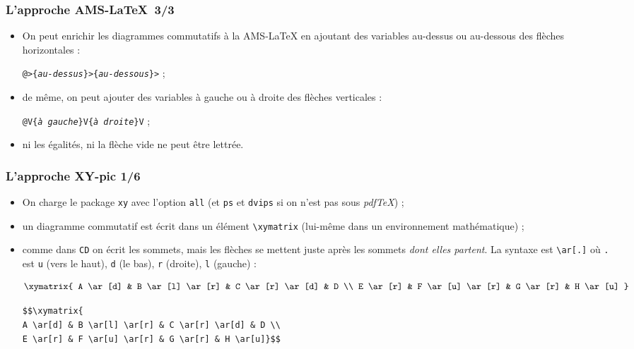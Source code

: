 \begin{frame}[fragile]
\frametitle{L'approche AMS-\LaTeX\ 3/3}

\begin{itemize}

\item On peut enrichir les diagrammes commutatifs \og à la AMS-\LaTeX\fg{} en ajoutant des variables au-dessus ou au-dessous des flèches horizontales : 

\texttt{@>\{\textit{au-dessus}\}>\{\textit{au-dessous}\}>} ;

\item de même, on peut ajouter des variables à gauche ou à droite des flèches verticales :

\texttt{@V\{\textit{à gauche}\}V\{\textit{à droite}\}V} ;

\item ni les égalités, ni la flèche vide ne peut être lettrée.

\end{itemize}

\end{frame}

\begin{frame}[fragile]
\frametitle{L'approche XY-pic 1/6}

\begin{itemize}

\item On charge le package \texttt{xy} avec l'option \texttt{all} (et  \texttt{ps} et \texttt{dvips} si on n'est pas sous \emph{pdf\TeX}) ;

\item un diagramme commutatif est écrit dans un élément \verb=\xymatrix= (lui-même dans un environnement mathématique) ;

\item comme dans \texttt{CD} on écrit les sommets, mais les flèches se mettent juste après les sommets \emph{dont elles partent}. La syntaxe est \verb=\ar[.]= où \texttt{.} est \texttt{u} (vers le haut), \texttt{d} (le bas), \texttt{r} (droite), \texttt{l} (gauche) :

$$\xymatrix{
A \ar[d] & B \ar[l] \ar[r] & C \ar[r] \ar[d] & D \\
E \ar[r] & F \ar[u] \ar[r] & G \ar[r] & H \ar[u]
}$$

\begin{verbatim}
$$\xymatrix{
A \ar[d] & B \ar[l] \ar[r] & C \ar[r] \ar[d] & D \\
E \ar[r] & F \ar[u] \ar[r] & G \ar[r] & H \ar[u]}$$
\end{verbatim}

\end{itemize}

\end{frame}

